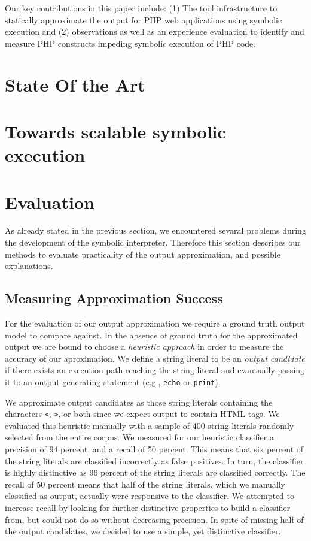 \documentclass[preprint]{sig-alternate-05-2015}
\begin{document}
Our key contributions in this paper include: (1) The tool infrastructure to
statically approximate the output for PHP web applications using symbolic
execution and (2) observations as well as an experience evaluation to identify
and measure PHP constructs impeding symbolic execution of PHP code.

\section{State Of the Art}

\section{Towards scalable symbolic execution}%


\section{Evaluation}
As already stated in the previous section, we encountered sevaral problems
during the development of the symbolic interpreter. Therefore this section
describes our methods to evaluate practicality of the output approximation, and
possible explanations.

\subsection{Measuring Approximation Success} \label{heuristic}
For the evaluation of our output approximation we require a ground truth output model to compare against.
In the absence of ground truth for the approximated output we are bound to choose a \emph{heuristic approach} in order to measure the accuracy of our aproximation. We define a string literal to be an \emph{output candidate} if there exists an execution path reaching the string literal and evantually passing it to an 
output-generating statement (e.g., \texttt{echo} or \texttt{print}).

We approximate output candidates as those string literals containing the characters \texttt{<}, \texttt{>}, or both since we expect output to contain HTML tags. We evaluated this heuristic manually
with a sample of 400 string literals randomly selected from the entire corpus.
We measured for our heuristic classifier a precision of 94 percent, and a recall
of 50 percent. This means that six percent of the string literals are classified incorrectly as false positives. In turn, the classifier is highly distinctive as 96 percent of the string literals are classified correctly. The recall of 50 percent means that half of the string literals, which we manually classified as output, actually were responsive to the classifier. We attempted to increase recall by looking for further distinctive properties to build a classifier from, but could not do so without decreasing precision. In spite of missing half of the output candidates, we decided to use a simple, yet distinctive classifier.
\end{document}
